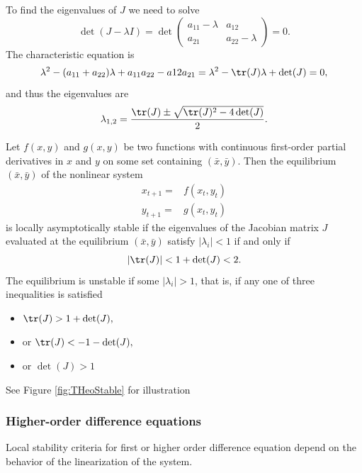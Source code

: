 To find the eigenvalues of $J$ we need to solve 
$$\det (J-\lambda I)=\det \left ( 
\begin{array}{cc}
a_{11}-\lambda & a_{12} \\
a_{21} & a_{22} -\lambda
\end{array}
\right )=0.$$
The characteristic equation is
$$\lambda ^2 -(a_{11}+a_{22})\lambda + a_{11}a_{22}-a{12}a_{21}=\lambda ^2 -\tr(J)\lambda + \det (J)=0,$$
and thus the eigenvalues are
$$\lambda_{1,2}=\frac{\tr(J)\pm \sqrt{\tr(J)^2-4\det (J)}}{2}.$$

\begin{theorem}\label{theo:stable2dim}
Let $f(x,y)$ and $g(x,y)$ be two functions with continuous first-order partial derivatives in $x$ and $y$ on some set containing $(\bar x, \bar y)$. Then the equilibrium $(\bar x, \bar y)$ of the nonlinear system
$$
\begin{array}{cc}
x_{t+1}=& f(x_t,y_t)\\
y_{t+1}=& g(x_t,y_t)
\end{array}$$
is locally asymptotically stable if the eigenvalues of the Jacobian matrix $J$ evaluated at  the equilibrium $(\bar x, \bar y)$ satisfy $|\lambda _i|<1$ if and only if
$$|\tr(J)|<1+\det (J)<2.$$
The equilibrium is unstable if some $|\lambda _i|>1$, that is, if any one of three inequalities is satisfied
\begin{itemize}
\item $\tr(J)>1 + \det (J),$
\item or $\tr(J)<-1 - \det (J),$
\item or $\det (J)>1$
\end{itemize}
\end{theorem}

See Figure \ref{fig:THeoStable} for illustration



\subsubsection{Higher-order difference equations}
Local stability criteria for first or higher order difference equation depend on the behavior of the linearization of the system.

